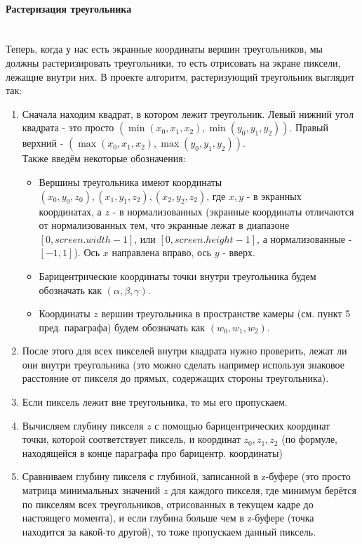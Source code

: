 \documentclass{article}
\begin{document}
\paragraph{Растеризация треугольника}
$\text{}$\\
Теперь, когда у нас есть экранные координаты вершин треугольников, мы должны растеризировать треугольники, то есть отрисовать на экране пиксели, лежащие внутри них.
В проекте алгоритм, растеризующий треугольник выглядит так:
\begin{enumerate}
	\item Сначала находим квадрат, в котором лежит треугольник. Левый нижний угол квадрата - это просто $(\min(x_0, x_1, x_2), \min(y_0, y_1, y_2))$. Правый верхний - $(\max(x_0, x_1, x_2), \max(y_0, y_1, y_2))$. \\
	Также введём некоторые обозначения:
	\begin{itemize}
		\item Вершины треугольника имеют координаты $(x_0, y_0, z_0), (x_1, y_1, z_2), (x_2, y_2, z_2)$, где $x, y$ - в экранных координатах, а $z$ - в нормализованных (экранные координаты отличаются от нормализованных тем, что экранные лежат в диапазоне $[0, screen.width - 1]$, или $[0, screen.height - 1]$, а нормализованные - $[-1, 1]$). Ось $x$ направлена вправо, ось $y$ - вверх. 
		\item Барицентрические координаты точки внутри треугольника будем обозначать как $(\alpha, \beta, \gamma)$. 
		\item Координаты $z$ вершин треугольника в пространстве камеры (см. пункт 5 пред. параграфа) будем обозначать как $(w_0, w_1, w_2)$.
	\end{itemize}
	\item После этого для всех пикселей внутри квадрата нужно проверить, лежат ли они внутри треугольника (это можно сделать например используя знаковое расстояние от пикселя до прямых, содержащих стороны треугольника). 
	\item Если пиксель лежит вне треугольника, то мы его пропускаем.
	\item Вычисляем глубину пикселя $z$ с помощью барицентрических координат точки, которой соответствует пиксель, и координат $z_0, z_1, z_2$ (по формуле, находящейся в конце параграфа про барицентр. координаты) 
	\item Сравниваем глубину пикселя с глубиной, записанной в z-буфере (это просто матрица минимальных значений $z$ для каждого пикселя, где минимум берётся по пикселям всех треугольников, отрисованных в текущем кадре до настоящего момента), и если глубина больше чем в z-буфере (точка находится за какой-то другой), то тоже пропускаем данный пиксель. 

\end{enumerate}
\end{document}

